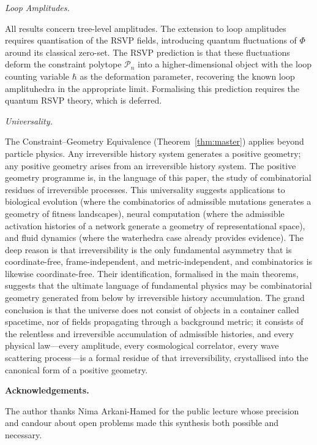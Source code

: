 \documentclass[11pt]{article}
\theoremstyle{plain}
\theoremstyle{definition}
\theoremstyle{remark}
\newcommand{\Phif}{\Phi}
\begin{document}
\medskip\noindent\textit{Loop Amplitudes.}

All results concern tree-level amplitudes. The extension to loop amplitudes requires quantisation of the RSVP fields, introducing quantum fluctuations of $\Phif$ around its classical zero-set. The RSVP prediction is that these fluctuations deform the constraint polytope $\mathcal{P}_n$ into a higher-dimensional object with the loop counting variable $\hbar$ as the deformation parameter, recovering the known loop amplituhedra in the appropriate limit. Formalising this prediction requires the quantum RSVP theory, which is deferred.

\medskip\noindent\textit{Universality.}

The Constraint--Geometry Equivalence (Theorem~\ref{thm:master}) applies beyond particle physics. Any irreversible history system generates a positive geometry; any positive geometry arises from an irreversible history system. The positive geometry programme is, in the language of this paper, the study of combinatorial residues of irreversible processes. This universality suggests applications to biological evolution (where the combinatorics of admissible mutations generates a geometry of fitness landscapes), neural computation (where the admissible activation histories of a network generate a geometry of representational space), and fluid dynamics (where the waterhedra case already provides evidence). The deep reason is that irreversibility is the only fundamental asymmetry that is coordinate-free, frame-independent, and metric-independent, and combinatorics is likewise coordinate-free. Their identification, formalised in the main theorems, suggests that the ultimate language of fundamental physics may be combinatorial geometry generated from below by irreversible history accumulation. The grand conclusion is that the universe does not consist of objects in a container called spacetime, nor of fields propagating through a background metric; it consists of the relentless and irreversible accumulation of admissible histories, and every physical law---every amplitude, every cosmological correlator, every wave scattering process---is a formal residue of that irreversibility, crystallised into the canonical form of a positive geometry.

\bigskip\noindent\textbf{Acknowledgements.}

The author thanks Nima Arkani-Hamed for the public lecture whose precision and candour about open problems made this synthesis both possible and necessary.

\newpage


\end{document}
